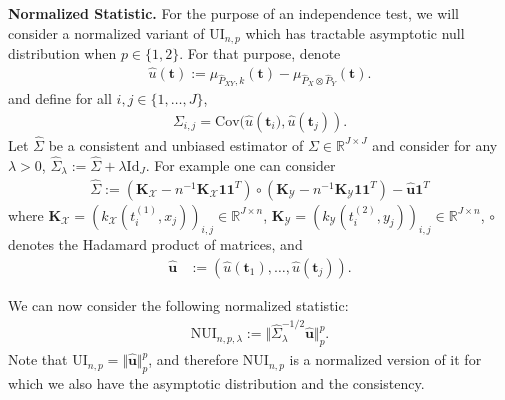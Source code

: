 \textbf{Normalized Statistic.} For the purpose of an independence test, we will consider a normalized variant of $\text{UI}_{n,p}$ which has tractable asymptotic null distribution when $p\in\{1,2\}$. For that purpose, denote
\begin{align*}
    \widehat{u}(\mathbf{t}):=\mu_{\widehat{P}_{XY},k}(\mathbf{t})-\mu_{\widehat{P}_X\otimes \widehat{P}_Y}(\mathbf{t}).
\end{align*}
and define for all $i,j\in\{1,\dots,J\}$, 
\begin{align*}
\Sigma_{i,j} = \text{Cov}(\widehat{u}\left(\mathbf{t}_i),\widehat{u}(\mathbf{t}_j)\right).
\end{align*}
Let $\widehat{\Sigma}$ be a consistent and unbiased estimator of $\Sigma\in\mathbb{R}^{J\times J}$ and consider for any $\lambda>0$, $\widehat{\Sigma}_{\lambda}:=\widehat{\Sigma} + \lambda \text{Id}_J $. For example one can consider 
\begin{align*}
    \widehat{\Sigma}:=(\mathbf{K}_{\mathcal{X}}-n^{-1}\mathbf{K}_{\mathcal{X}}\mathbf{1}\mathbf{1}^T)\circ(\mathbf{K}_{\mathcal{Y}}-n^{-1}\mathbf{K}_{\mathcal{Y}}\mathbf{1}\mathbf{1}^T)- \widehat{\mathbf{u}}\mathbf{1}^T
\end{align*}
where $\mathbf{K}_{\mathcal{X}}=(k_{\mathcal{X}}(t_i^{(1)},x_j))_{i,j}\in\mathbb{R}^{J\times n}$, $\mathbf{K}_{\mathcal{Y}}=(k_{\mathcal{Y}}(t_i^{(2)},y_j))_{i,j}\in\mathbb{R}^{J\times n}$, $\circ$ denotes the Hadamard product of matrices, and 
\begin{align*}
    \widehat{\mathbf{u}}&:=(\widehat{u}(\mathbf{t}_1),\dots,\widehat{u}(\mathbf{t}_j)).
\end{align*}

We can now consider the following normalized statistic:
\begin{align*}
    \text{NUI}_{n,p,\lambda}:=\Vert  \widehat{\Sigma}_{\lambda}^{-1/2}\widehat{\mathbf{u}}\Vert_{p}^p.
\end{align*}
Note that $\text{UI}_{n,p}=\Vert \widehat{\mathbf{u}}\Vert_{p}^p$, and therefore $\text{NUI}_{n,p}$ is a normalized version of it for which we also have the asymptotic distribution and the consistency.

